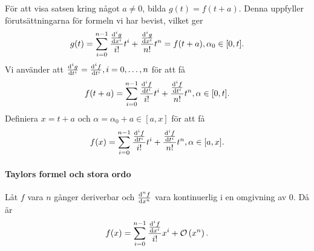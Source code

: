 För att visa satsen kring något $a\neq 0$, bilda $g(t) = f(t + a)$. Denna uppfyller förutsättningarna för formeln vi har bevist, vilket ger
\begin{align*}
	g(t) = \sum\limits_{i = 0}^{n - 1}\frac{\dv[i]{g}{x} (0)}{i!}t^i + \frac{\dv[i]{g}{x} (\alpha_0)}{n!}t^n = f(t + a), \alpha_0\in [0, t].
\end{align*}
Vi använder att $\dv[i]{g}{t} (t) = \dv[i]{f}{t} (t + a), i = 0, \dots, n$ för att få
\begin{align*}
	f(t + a) = \sum\limits_{i = 0}^{n - 1}\frac{\dv[i]{f}{t} (a)}{i!}t^i + \frac{\dv[i]{f}{t} (\alpha_0 + a)}{n!}t^n, \alpha\in [0, t].
\end{align*}
Definiera $x = t + a$ och $\alpha = \alpha_0 + a\in [a, x]$ för att få
\begin{align*}
	f(x) = \sum\limits_{i = 0}^{n - 1}\frac{\dv[i]{f}{t} (a)}{i!}t^i + \frac{\dv[i]{f}{t} (\alpha)}{n!}t^n, \alpha\in [a, x].
\end{align*}

\paragraph{Taylors formel och stora ordo}
Låt $f$ vara $n$ gånger deriverbar och $\dv[n]{f}{x}$ vara kontinuerlig i en omgivning av $0$. Då är
\begin{align*}
	f(x) = \sum\limits_{i = 0}^{n - 1}\frac{\dv[i]{f}{x} (0)}{i!}x^i + \mathcal{O}\left(x^n\right).
\end{align*}

\proof